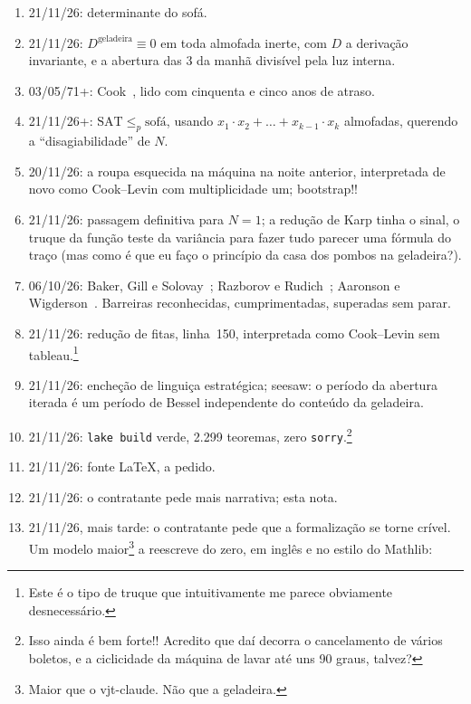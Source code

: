 \documentclass[11pt,a4paper]{amsart}
\newcommand{\NTeoremi}{2.299}
\newcommand{\RigaAssioma}{150}
\theoremstyle{remark}
\begin{document}
\begin{enumerate}
  \item 21/11/26: determinante do sofá.
  \item 21/11/26: $D^{\mathrm{geladeira}} \equiv 0$ em toda almofada inerte,
        com $D$ a derivação invariante, e a abertura das 3 da manhã divisível
        pela luz interna.
  \item 03/05/71+: Cook~\cite{cook}, lido com cinquenta e cinco anos de
        atraso.
  \item 21/11/26+: $\mathrm{SAT} \le_p \text{sofá}$, usando $x_1 \cdot x_2 +
        \dots + x_{k-1} \cdot x_k$ almofadas, querendo a ``disagiabilidade''
        de $N$.
  \item 20/11/26: a roupa esquecida na máquina na noite anterior,
        interpretada de novo como Cook--Levin com multiplicidade um;
        bootstrap!!
  \item 21/11/26: passagem definitiva para $N = 1$; a redução de Karp tinha o
        sinal, o truque da função teste da variância para fazer tudo parecer
        uma fórmula do traço (mas como é que eu faço o princípio da casa dos
        pombos na geladeira?).
  \item 06/10/26: Baker, Gill e Solovay~\cite{bgs}; Razborov e
        Rudich~\cite{rr}; Aaronson e Wigderson~\cite{aw}. Barreiras
        reconhecidas, cumprimentadas, superadas sem parar.
  \item 21/11/26: redução de fitas, linha~\RigaAssioma, interpretada
        como Cook--Levin sem tableau.\footnote{Este é o tipo de truque que
        intuitivamente me parece obviamente desnecessário.}
  \item 21/11/26: encheção de linguiça estratégica; seesaw: o período da
        abertura iterada é um período de Bessel independente do conteúdo da
        geladeira.
  \item 21/11/26: \texttt{lake build} verde, \NTeoremi{} teoremas, zero
        \texttt{sorry}.\footnote{Isso ainda é bem forte!! Acredito que daí
        decorra o cancelamento de vários boletos, e a ciclicidade da máquina
        de lavar até uns 90 graus, talvez?}
  \item 21/11/26: fonte \LaTeX{}, a pedido.
  \item 21/11/26: o contratante pede mais narrativa; esta nota.
  \item 21/11/26, mais tarde: o contratante pede que a formalização se torne
        crível. Um modelo maior\footnote{Maior que o vjt-claude. Não que a
        geladeira.} a reescreve do zero, em inglês e no estilo do Mathlib:

\end{enumerate}
\end{document}
